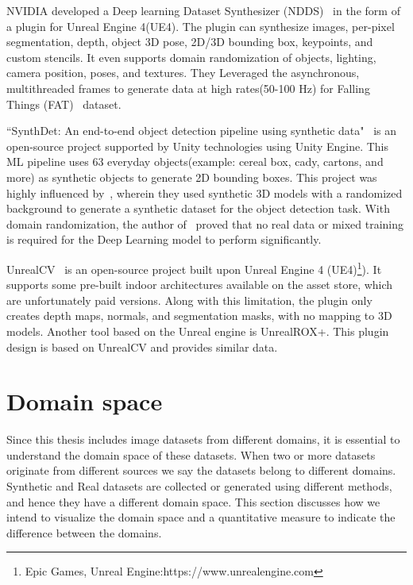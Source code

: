 NVIDIA developed a Deep learning Dataset Synthesizer (NDDS)~\cite{to2018ndds} in the form of a plugin for Unreal Engine 4(UE4).
The plugin can synthesize images, per-pixel segmentation, depth, object 3D pose, 2D/3D bounding box, keypoints, and custom stencils.
It even supports domain randomization of objects, lighting, camera position, poses, and textures.
They Leveraged the asynchronous, multithreaded frames to generate data at high rates(50-100 Hz) for Falling Things (FAT)~\cite{Tremblay2018} dataset.

``SynthDet: An end-to-end object detection pipeline using synthetic data"~\cite{synthdet2020} is an open-source project supported by Unity technologies using Unity Engine.
This ML pipeline uses 63 everyday objects(example: cereal box, cady, cartons, and more) as synthetic objects to generate 2D bounding boxes.
This project was highly influenced by~\cite{hinterstoisser2019annotation}, wherein they used synthetic 3D models with a randomized background to generate a synthetic dataset for the object detection task.
With domain randomization, the author of~\cite{hinterstoisser2019annotation} proved that no real data or mixed training is required for the Deep Learning model to perform significantly.

UnrealCV~\cite{Qiu2017} is an open-source project built upon Unreal Engine 4 (UE4)\footnote{Epic Games, Unreal Engine:https://www.unrealengine.com}).
It supports some pre-built indoor architectures available on the asset store, which are unfortunately paid versions.
Along with this limitation, the plugin only creates depth maps, normals, and segmentation masks, with no mapping to 3D models.
Another tool based on the Unreal engine is UnrealROX+\cite{martinezgonzalez2021unrealrox}.
This plugin design is based on UnrealCV and provides similar data.

\section{Domain space}\label{sec:domain-space}

Since this thesis includes image datasets from different domains, it is essential to understand the domain space of these datasets.
When two or more datasets originate from different sources we say the datasets belong to different domains.
Synthetic and Real datasets are collected or generated using different methods, and hence they have a different domain space.
This section discusses how we intend to visualize the domain space and a quantitative measure to indicate the difference between the domains.

